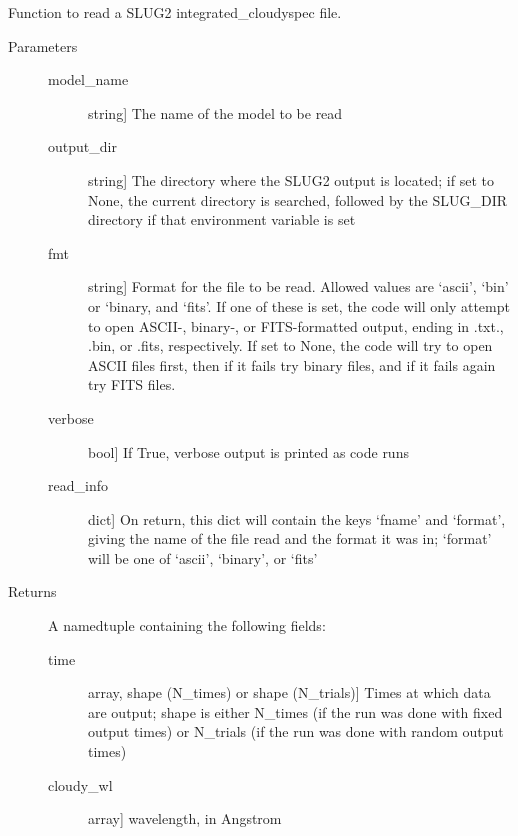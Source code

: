 \documentclass[letterpaper,10pt,english]{sphinxmanual}
\begin{document}
\begin{fulllineitems}
\label{cloudy:slugpy.cloudy.read_integrated_cloudyspec}
Function to read a SLUG2 integrated\_cloudyspec file.
\begin{description}
\item[{Parameters}] \leavevmode\begin{description}
\item[{model\_name}] \leavevmode{[}string{]}
The name of the model to be read

\item[{output\_dir}] \leavevmode{[}string{]}
The directory where the SLUG2 output is located; if set to None,
the current directory is searched, followed by the SLUG\_DIR
directory if that environment variable is set

\item[{fmt}] \leavevmode{[}string{]}
Format for the file to be read. Allowed values are `ascii',
`bin' or `binary, and `fits'. If one of these is set, the code
will only attempt to open ASCII-, binary-, or FITS-formatted
output, ending in .txt., .bin, or .fits, respectively. If set
to None, the code will try to open ASCII files first, then if
it fails try binary files, and if it fails again try FITS
files.

\item[{verbose}] \leavevmode{[}bool{]}
If True, verbose output is printed as code runs

\item[{read\_info}] \leavevmode{[}dict{]}
On return, this dict will contain the keys `fname' and
`format', giving the name of the file read and the format it
was in; `format' will be one of `ascii', `binary', or `fits'

\end{description}

\item[{Returns}] \leavevmode
A namedtuple containing the following fields:
\begin{description}
\item[{time}] \leavevmode{[}array, shape (N\_times) or shape (N\_trials){]}
Times at which data are output; shape is either N\_times (if
the run was done with fixed output times) or N\_trials (if
the run was done with random output times)

\item[{cloudy\_wl}] \leavevmode{[}array{]}
wavelength, in Angstrom


\end{description}
\end{description}
\end{fulllineitems}
\end{document}
